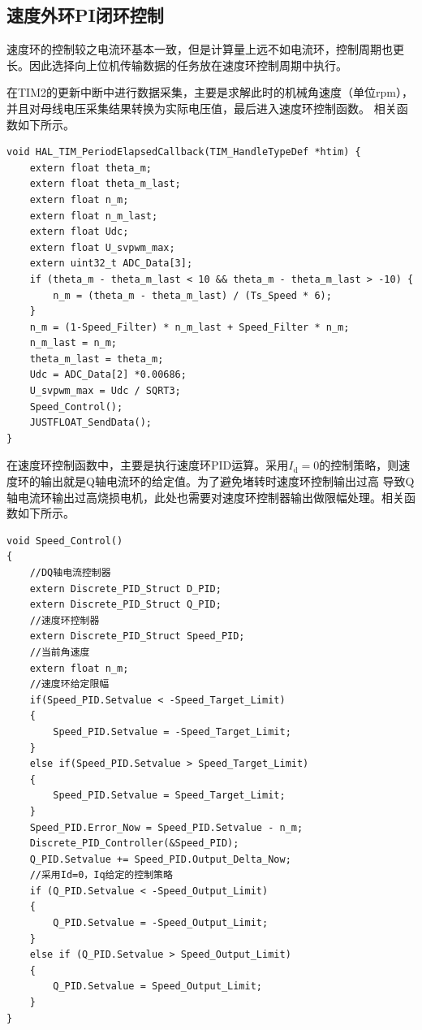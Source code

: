 \subsection{速度外环PI闭环控制}

速度环的控制较之电流环基本一致，但是计算量上远不如电流环，控制周期也更长。因此选择向上位机传输数据的任务放在速度环控制周期中执行。

在TIM2的更新中断中进行数据采集，主要是求解此时的机械角速度（单位rpm），并且对母线电压采集结果转换为实际电压值，最后进入速度环控制函数。
相关函数如下所示。

\begin{lstlisting}
void HAL_TIM_PeriodElapsedCallback(TIM_HandleTypeDef *htim) {
    extern float theta_m;
    extern float theta_m_last;
    extern float n_m;
    extern float n_m_last;
    extern float Udc;
    extern float U_svpwm_max;
    extern uint32_t ADC_Data[3];
    if (theta_m - theta_m_last < 10 && theta_m - theta_m_last > -10) {
        n_m = (theta_m - theta_m_last) / (Ts_Speed * 6);
    }
    n_m = (1-Speed_Filter) * n_m_last + Speed_Filter * n_m;
    n_m_last = n_m;
    theta_m_last = theta_m;
    Udc = ADC_Data[2] *0.00686;
    U_svpwm_max = Udc / SQRT3;
    Speed_Control();
    JUSTFLOAT_SendData();
}
\end{lstlisting}

在速度环控制函数中，主要是执行速度环PID运算。采用\(I_{\mathrm{d}}=0\)的控制策略，则速度环的输出就是Q轴电流环的给定值。为了避免堵转时速度环控制输出过高
导致Q轴电流环输出过高烧损电机，此处也需要对速度环控制器输出做限幅处理。相关函数如下所示。

\begin{lstlisting}
void Speed_Control()
{
    //DQ轴电流控制器
    extern Discrete_PID_Struct D_PID;
    extern Discrete_PID_Struct Q_PID;
    //速度环控制器
    extern Discrete_PID_Struct Speed_PID;
    //当前角速度
    extern float n_m;
    //速度环给定限幅
    if(Speed_PID.Setvalue < -Speed_Target_Limit)
    {
        Speed_PID.Setvalue = -Speed_Target_Limit;
    }
    else if(Speed_PID.Setvalue > Speed_Target_Limit)
    {
        Speed_PID.Setvalue = Speed_Target_Limit;
    }
    Speed_PID.Error_Now = Speed_PID.Setvalue - n_m;
    Discrete_PID_Controller(&Speed_PID);
    Q_PID.Setvalue += Speed_PID.Output_Delta_Now;
    //采用Id=0，Iq给定的控制策略
    if (Q_PID.Setvalue < -Speed_Output_Limit)
    {
        Q_PID.Setvalue = -Speed_Output_Limit;
    }
    else if (Q_PID.Setvalue > Speed_Output_Limit)
    {
        Q_PID.Setvalue = Speed_Output_Limit;
    }
}
\end{lstlisting}

